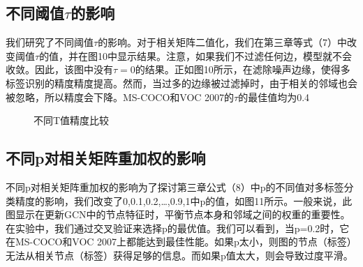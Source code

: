 \subsection{不同阈值$\tau$的影响}

我们研究了不同阈值$\tau$的影响。对于相关矩阵二值化，我们在第三章等式（7）中改变阈值$\tau$的值，并在图10中显示结果。注意，如果我们不过滤任何边，模型就不会收敛。因此，该图中没有$\tau=0$的结果。正如图10所示，在滤除噪声边缘，使得多标签识别的精度精度提高。然而，当过多的边缘被过滤掉时，由于相关的邻域也会被忽略，所以精度会下降。MS-COCO和VOC 2007的$\tau$的最佳值均为0.4

\begin{figure}[htbp]
	\centering
	 
	\centering
	\caption{不同T值精度比较}
\end{figure}


\subsection{不同p对相关矩阵重加权的影响}
不同p对相关矩阵重加权的影响为了探讨第三章公式（8）中p的不同值对多标签分类精度的影响，我们改变了{0,0.1,0.2,…,0.9,1}中p的值，如图11所示。一般来说，此图显示在更新GCN中的节点特征时，平衡节点本身和邻域之间的权重的重要性。在实验中，我们通过交叉验证来选择p的最优值。我们可以看到，当p=0.2时，它在MS-COCO和VOC 2007上都能达到最佳性能。如果p太小，则图的节点（标签）无法从相关节点（标签）获得足够的信息。而如果p值太大，则会导致过度平滑。


